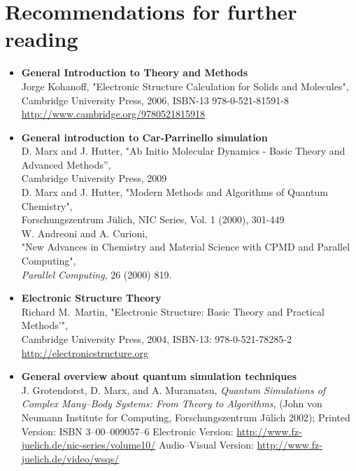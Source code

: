 \documentclass[twoside,10pt,titlepage,a4paper]{article}
\newcommand{\htref}[2]{\href{#1}{#2}}
\newcommand{\htref}[2]{\htmladdnormallink{#2}{#1}}
\begin{document}
\section{Recommendations for further reading}\label{intro:further}
\begin{itemize}
\item {\bf General Introduction to Theory and Methods}\\
  Jorge Kohanoff, "Electronic Structure Calculation for Solids and Molecules",\\
  Cambridge University Press, 2006, ISBN-13 978-0-521-81591-8\\
  \htref{http://www.cambridge.org/9780521815918}%
{http://www.cambridge.org/9780521815918}
\item {\bf General introduction to Car-Parrinello simulation}\\
  D. Marx and J. Hutter, "Ab Initio Molecular Dynamics - Basic Theory
  and Advanced Methods'',\\
  Cambridge University Press, 2009\\
  D. Marx and J. Hutter, "Modern Methods and Algorithms of Quantum Chemistry",\\
  Forschungszentrum J\"ulich, NIC Series, Vol. 1 (2000), 301-449 \\
  W. Andreoni and A. Curioni,\\
 "New Advances in Chemistry and Material Science with CPMD and Parallel Computing",\\
{ \em Parallel Computing}, 26 (2000) 819.
\item {\bf Electronic Structure Theory}\\
  Richard M.~Martin, "Electronic Structure: Basic Theory and Practical Methods'",\\
  Cambridge University Press, 2004, ISBN-13: 978-0-521-78285-2 \\
  \htref{http://electronicstructure.org}{http://electronicstructure.org}
\item{\bf General overview about quantum simulation techniques}\\
  J. Grotendorst, D. Marx, and A. Muramatsu,
  {\em Quantum Simulations of Complex Many--Body Systems:
  From Theory to Algorithms},
  (John von Neumann Institute for Computing,
  Forschungszentrum J\"ulich 2002);
  \newline
  Printed Version:
  ISBN 3--00--009057--6
  \newline
  Electronic Version:
  \htref{http://www.fz-juelich.de/nic-series/volume10/}%
  {http://www.fz-juelich.de/nic-series/volume10/}
  \newline
  Audio--Visual Version:
  \htref{http://www.fz-juelich.de/video/wsqs/}%
  {http://www.fz-juelich.de/video/wsqs/}


\end{itemize}
\end{document}
